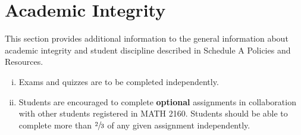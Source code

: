 \documentclass[12pt]{article}
\begin{document}
\section{Academic Integrity}

This section provides additional information to the general information about academic integrity and student discipline described in Schedule A Policies and Resources.

\begin{enumerate}[(i)]
\item Exams and quizzes are to be completed independently.

\item Students are encouraged to complete {\bf optional} assignments in collaboration with other students registered in MATH 2160. Students should be able to complete more than $\sfrac{2}{3}$ of any given assignment independently.
\end{enumerate}
\end{document}
